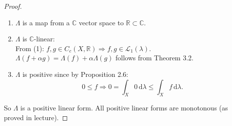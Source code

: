 \documentclass[10pt]{article}\usepackage[]{graphicx}\usepackage[]{color}
\newcommand{\R}{\mathbb{R}}
\newcommand{\C}{\mathbb{C}}
\newcommand{\df}{\,\textrm{d}}
\begin{document}
\begin{enumerate}[(a)]
\begin{proof}
\begin{enumerate}[(1)]
    \item $\Lambda$ is a map from a $\C$ vector space to $\R \subset \C$.
    
    \item $\Lambda$ is $\C$-linear:\\ 
    From (1): $f,g \in C_c(X, \R) \Rightarrow f,g \in \mathscr{L}_1(\lambda)$.
    $\Lambda(f + \alpha g) = \Lambda(f) + \alpha\Lambda(g)$ follows from Theorem 3.2.
    
    \item $\Lambda$ is positive since by Proposition 2.6:
    \[
      0 \leq f \Rightarrow 0 = \int_X 0 \df \lambda \leq \int_X f \df \lambda.
    \]
  \end{enumerate}

    So $\Lambda$ is a positive linear form.
    All positive linear forms are monotonous (as proved in lecture).
  \end{proof}
\end{enumerate}
\end{document}
